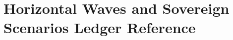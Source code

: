 \documentclass[11pt,a4paper]{book}
\newif\ifusebiblatex
\DeclareRobustCommand{\_}{\ifmmode\text{\symbol{95}}\else\symbol{95}\allowbreak\fi}
\theoremstyle{plain}
\theoremstyle{definition}
\begin{document}
\part{Horizontal Waves and Sovereign Scenarios Ledger Reference}







\backmatter
\ifusebiblatex
    \printbibliography[heading=bibintoc]
\else
    \cleardoublepage
    
    
\fi
\end{document}
